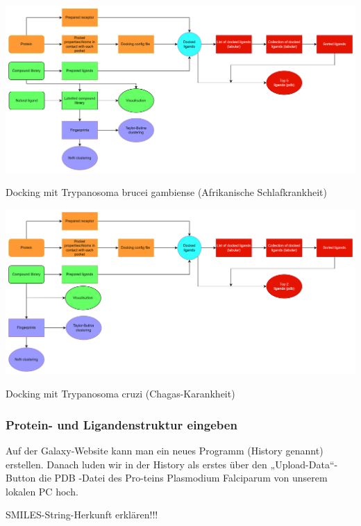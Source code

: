 \documentclass[11pt]{article}
\begin{document}
{    \includegraphics[width=\linewidth]{flowchart_Trypanosoma brucei gambiense}
    \caption{Docking mit Trypanosoma brucei gambiense (Afrikanische Schlafkrankheit)}

    \includegraphics[width=\linewidth]{flowchart_Trypanosoma cruzi}
    \caption{Docking mit Trypanosoma cruzi (Chagas-Karankheit)}

    \subsubsection{Protein- und Ligandenstruktur eingeben}\label{subsec:protein--und-ligandenstruktur-eingeben}

    Auf der Galaxy-Website kann man ein neues Programm (History genannt) erstellen. Danach luden wir in der History als erstes über den „Upload-Data“-Button die PDB -Datei des Pro-teins Plasmodium Falciparum von unserem lokalen PC hoch.

    SMILES-String-Herkunft erklären!!!

}
\end{document}
